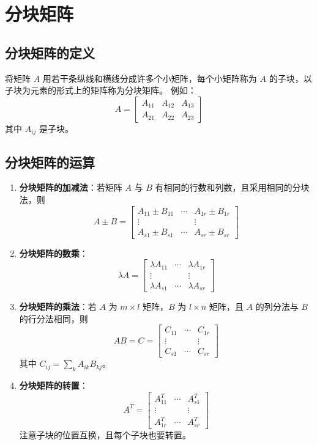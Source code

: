 \documentclass[UTF8]{ctexart}
\theoremstyle{mydef}
\begin{document}
\section{分块矩阵}

\subsection{分块矩阵的定义}
将矩阵 $A$ 用若干条纵线和横线分成许多个小矩阵，每个小矩阵称为 $A$ 的子块，以子块为元素的形式上的矩阵称为分块矩阵。
例如：
$$
A = \begin{bmatrix} A_{11} & A_{12} & A_{13} \\ A_{21} & A_{22} & A_{23} \end{bmatrix}
$$
其中 $A_{ij}$ 是子块。

\subsection{分块矩阵的运算}
\begin{enumerate}
    \item \textbf{分块矩阵的加减法}：若矩阵 $A$ 与 $B$ 有相同的行数和列数，且采用相同的分块法，则
    $$
    A \pm B = \begin{bmatrix} A_{11} \pm B_{11} & \cdots & A_{1r} \pm B_{1r} \\ \vdots & & \vdots \\ A_{s1} \pm B_{s1} & \cdots & A_{sr} \pm B_{sr} \end{bmatrix}
    $$
    \item \textbf{分块矩阵的数乘}：
    $$
    \lambda A = \begin{bmatrix} \lambda A_{11} & \cdots & \lambda A_{1r} \\ \vdots & & \vdots \\ \lambda A_{s1} & \cdots & \lambda A_{sr} \end{bmatrix}
    $$
    \item \textbf{分块矩阵的乘法}：若 $A$ 为 $m \times l$ 矩阵，$B$ 为 $l \times n$ 矩阵，且 $A$ 的列分法与 $B$ 的行分法相同，则
    $$
    AB = C = \begin{bmatrix} C_{11} & \cdots & C_{1r} \\ \vdots & & \vdots \\ C_{s1} & \cdots & C_{sr} \end{bmatrix}
    $$
    其中 $C_{ij} = \sum_{k} A_{ik} B_{kj}$。
    \item \textbf{分块矩阵的转置}：
    $$
    A^T = \begin{bmatrix} A_{11}^T & \cdots & A_{s1}^T \\ \vdots & & \vdots \\ A_{1r}^T & \cdots & A_{sr}^T \end{bmatrix}
    $$
    注意子块的位置互换，且每个子块也要转置。
\end{enumerate}
\end{document}
